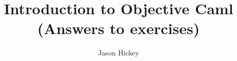 \documentclass{book}
\title{Introduction to Objective Caml\\
(Answers to exercises)}
\author{Jason Hickey}
\begin{document}
\sloppy
\raggedbottom

\maketitle
\tableofcontents

%
\answers

\setcounter{section}{1}
\renewcommand\thesection{\arabic{section}}




















\end{document}
